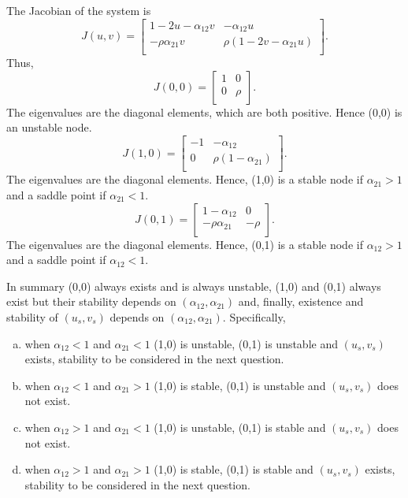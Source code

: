 \documentclass[]{article}
\newcommand{\bb}{\begin{equation}}
\newcommand{\ee}{\end{equation}}
\renewcommand{\l}{\left(}
\renewcommand{\r}{\right)}
\begin{document}
\begin{Answ}
\subsubsection{}
The Jacobian of the system is
\bb
J(u,v)=\left[ {\begin{array}{cc}
   1-2u-\alpha_{12} v & -\alpha_{12}u \\
   -\rho\alpha_{21}v & \rho\l 1-2v-\alpha_{21} u\r \\
  \end{array} } \right].
\ee
Thus,
\bb
J(0,0)=\left[ {\begin{array}{cc}
   1 & 0 \\
   0 & \rho \\
  \end{array} } \right].
\ee
The eigenvalues are the diagonal elements, which are both positive. Hence (0,0) is an unstable node.
\bb
J(1,0)=\left[ {\begin{array}{cc}
   -1 & -\alpha_{12} \\
   0 & \rho(1-\alpha_{21}) \\
  \end{array} } \right].
\ee
The eigenvalues are the diagonal elements. Hence, (1,0) is a stable node if $\alpha_{21}>1$ and a saddle point if $\alpha_{21}<1$.
\bb
J(0,1)=\left[ {\begin{array}{cc}
   1-\alpha_{12} & 0 \\
   -\rho\alpha_{21} & -\rho \\
  \end{array} } \right].
\ee
The eigenvalues are the diagonal elements. Hence, (0,1) is a stable node if $\alpha_{12}>1$ and a saddle point if $\alpha_{12}<1$.


In summary (0,0) always exists and is always unstable, (1,0) and (0,1) always exist but their stability depends on $(\alpha_{12},\alpha_{21})$ and, finally, existence and stability of $(u_s,v_s)$ depends on $(\alpha_{12},\alpha_{21})$. Specifically,
\begin{enumerate}[(a)]
\item when $\alpha_{12}<1$ and $\alpha_{21}<1$ (1,0) is unstable, (0,1) is unstable and $(u_s, v_s)$ exists, stability to be considered in the next question.
\item when $\alpha_{12}<1$ and $\alpha_{21}>1$ (1,0) is stable, (0,1) is unstable and $(u_s,v_s)$ does not exist.
\item when $\alpha_{12}>1$ and $\alpha_{21}<1$ (1,0) is unstable, (0,1) is stable and $(u_s,v_s)$ does not exist.
\item when $\alpha_{12}>1$ and $\alpha_{21}>1$ (1,0) is stable, (0,1) is stable and $(u_s, v_s)$ exists, stability to be considered in the next question.
\end{enumerate}


\end{Answ}
\end{document}
